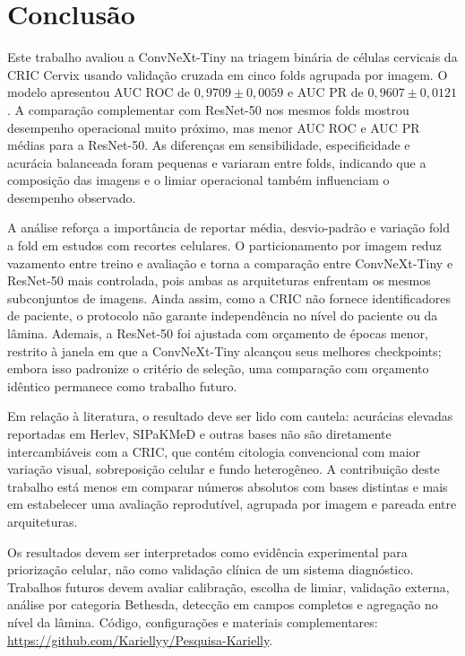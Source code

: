 \section{Conclusão}

Este trabalho avaliou a ConvNeXt-Tiny na triagem binária de células cervicais
da CRIC Cervix usando validação cruzada em cinco folds agrupada por imagem. O
modelo apresentou AUC ROC de $0{,}9709\pm0{,}0059$ e AUC PR de
$0{,}9607\pm0{,}0121$. A comparação complementar com ResNet-50 nos mesmos folds
mostrou desempenho operacional muito próximo, mas menor AUC ROC e AUC PR
médias para a ResNet-50. As diferenças em sensibilidade, especificidade e
acurácia balanceada foram pequenas e variaram entre folds, indicando que a
composição das imagens e o limiar operacional também influenciam o desempenho
observado.

A análise reforça a importância de reportar média, desvio-padrão e variação
fold a fold em estudos com recortes celulares. O particionamento por imagem
reduz vazamento entre treino e avaliação e torna a comparação entre ConvNeXt-Tiny
e ResNet-50 mais controlada, pois ambas as arquiteturas enfrentam os mesmos
subconjuntos de imagens. Ainda assim, como a CRIC não fornece identificadores de
paciente, o protocolo não garante independência no nível do paciente ou da
lâmina. Ademais, a ResNet-50 foi ajustada com orçamento de épocas menor, restrito
à janela em que a ConvNeXt-Tiny alcançou seus melhores checkpoints; embora isso
padronize o critério de seleção, uma comparação com orçamento idêntico permanece
como trabalho futuro.

Em relação à literatura, o resultado deve ser lido com cautela: acurácias
elevadas reportadas em Herlev, SIPaKMeD e outras bases não são diretamente
intercambiáveis com a CRIC, que contém citologia convencional com maior
variação visual, sobreposição celular e fundo heterogêneo. A contribuição deste
trabalho está menos em comparar números absolutos com bases distintas e mais em
estabelecer uma avaliação reprodutível, agrupada por imagem e pareada entre
arquiteturas.

Os resultados devem ser interpretados como evidência experimental para
priorização celular, não como validação clínica de um sistema diagnóstico.
Trabalhos futuros devem avaliar calibração, escolha de limiar, validação
externa, análise por categoria Bethesda, detecção em campos completos e
agregação no nível da lâmina. Código, configurações e materiais complementares:
\url{https://github.com/Kariellyy/Pesquisa-Karielly}.
